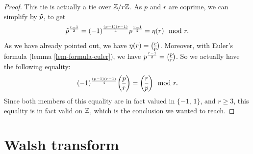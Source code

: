 \begin{proof}
This tie is actually a tie over $ \mathbb{Z}/r \mathbb{Z} $. As $ p $ and $ r $ are coprime, we can simplify by $ \tilde{p} $, to get
\begin{equation*}
\tilde{p}^{\frac{r-1}{2}} = (-1)^{\frac{(p-1) (r-1)}{4}} p^{\frac{r -1}{2}} = \eta (r) \mod{r}.
\end{equation*}
As we have already pointed out, we have $ \eta (r) = \legsymb{r}{p} $. Moreover, with Euler's formula (lemma \ref{lem-formula-euler}), we have $ p^{\frac{r-1}{2}} = \legsymb{p}{r} $. So we actually have the following equality:
\begin{equation*}
(-1)^{\frac{(p-1) (r-1)}{4}} \legsymb{p}{r} = \legsymb{r}{p} \mod{r}.
\end{equation*}
Since both members of this equality are in fact valued in $ \{- 1, \, 1\} $, and $ r \geq 3 $, this equality is in fact valid on $ \mathbb{Z} $, which is the conclusion we wanted to reach.
\end{proof}
 
\section{Walsh transform}
\label{sect1-transforme-walsh} 
 
